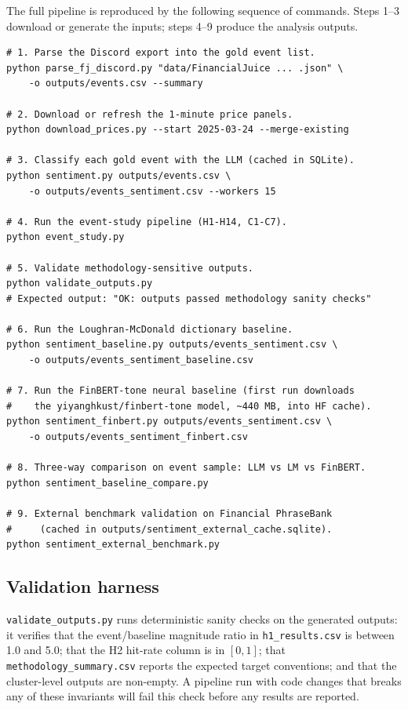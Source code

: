 The full pipeline is reproduced by the following sequence of
commands. Steps 1--3 download or generate the inputs; steps 4--9
produce the analysis outputs.

\begin{verbatim}
# 1. Parse the Discord export into the gold event list.
python parse_fj_discord.py "data/FinancialJuice ... .json" \
    -o outputs/events.csv --summary

# 2. Download or refresh the 1-minute price panels.
python download_prices.py --start 2025-03-24 --merge-existing

# 3. Classify each gold event with the LLM (cached in SQLite).
python sentiment.py outputs/events.csv \
    -o outputs/events_sentiment.csv --workers 15

# 4. Run the event-study pipeline (H1-H14, C1-C7).
python event_study.py

# 5. Validate methodology-sensitive outputs.
python validate_outputs.py
# Expected output: "OK: outputs passed methodology sanity checks"

# 6. Run the Loughran-McDonald dictionary baseline.
python sentiment_baseline.py outputs/events_sentiment.csv \
    -o outputs/events_sentiment_baseline.csv

# 7. Run the FinBERT-tone neural baseline (first run downloads
#    the yiyanghkust/finbert-tone model, ~440 MB, into HF cache).
python sentiment_finbert.py outputs/events_sentiment.csv \
    -o outputs/events_sentiment_finbert.csv

# 8. Three-way comparison on event sample: LLM vs LM vs FinBERT.
python sentiment_baseline_compare.py

# 9. External benchmark validation on Financial PhraseBank
#     (cached in outputs/sentiment_external_cache.sqlite).
python sentiment_external_benchmark.py
\end{verbatim}

\subsection*{Validation harness}

\texttt{validate\_outputs.py} runs deterministic sanity checks on
the generated outputs: it verifies that the event/baseline
magnitude ratio in \texttt{h1\_results.csv} is between 1.0 and
5.0; that the H2 hit-rate column is in $[0, 1]$; that
\texttt{methodology\_summary.csv} reports the expected target
conventions; and that the cluster-level outputs are non-empty. A
pipeline run with code changes that breaks any of these invariants
will fail this check before any results are reported.

